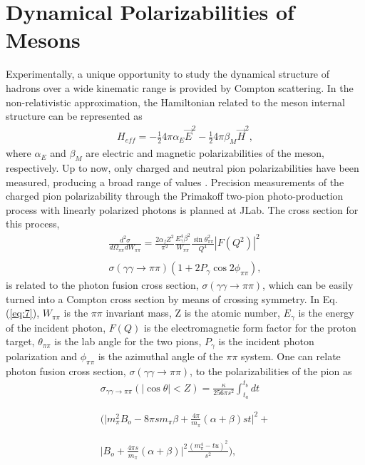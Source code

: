 \documentclass[3p,times,twocolumn]{revtex4}
\begin{document}
\section{Dynamical Polarizabilities of Mesons }

Experimentally, a unique opportunity to study the dynamical structure of hadrons over
a wide kinematic range is provided by Compton scattering. In the non-relativistic approximation, the Hamiltonian related to
the meson internal structure can be represented
as 
\begin{eqnarray}
H_{eff}=-\frac{1}{2}4\pi\alpha_{E}\vec{E}^{2}-\frac{1}{2}4\pi\beta_{M}\vec{H}^{2},\label{eq:6}
\end{eqnarray}
where $\alpha_{E}$ and $\beta_{M}$ are electric and magnetic
polarizabilities of the meson, respectively. Up to now,
only charged and neutral pion polarizabilities have been measured,
producing a broad range of values \cite{Ahrens,Antipov,Ba92}. Precision measurements of the charged pion polarizability through the
Primakoff two-pion photo-production process with linearly polarized
photons is planned at JLab. The cross section for this process,
\begin{eqnarray}
\frac{d^{2}\sigma}{d\Omega_{\pi\pi}dW_{\pi\pi}}=\frac{2\alpha_{f}Z^{2}}{\pi^{2}}\frac{E_{\gamma}^{4}\beta^{2}}{W_{\pi\pi}}\frac{\sin\theta_{\pi\pi}^{2}}{Q^{4}}|F(Q^{2})|^{2}
\nonumber \\ \nonumber \\
\sigma(\gamma\gamma\rightarrow\pi\pi)(1+2P_{\gamma}\cos2\phi_{\pi\pi}),\label{eq:7}
\end{eqnarray}
is related to the photon fusion cross section, $\sigma(\gamma\gamma\rightarrow\pi\pi)$,
which can be easily turned into a Compton cross section by means of crossing symmetry. In Eq.(\ref{eq:7}), $W_{\pi\pi}$ is the $\pi\pi$
invariant mass, Z is the atomic number, $E_{\gamma}$ is the energy
of the incident photon, $F(Q)$ is the electromagnetic form factor
for the proton target, $\theta_{\pi\pi}$ is the lab angle for the
two pions, $P_{\gamma}$ is the incident photon polarization and $\phi_{\pi\pi}$
is the azimuthal angle of the $\pi\pi$ system. One can
relate photon fusion cross section, $\sigma(\gamma\gamma\rightarrow\pi\pi)$,
to the polarizabilities of the pion \cite{Ba92,Do93} as
\begin{eqnarray}
\sigma_{\gamma\gamma\rightarrow\pi\pi}(|\cos\theta|<Z)=\frac{\kappa}{256\pi s^{2}}\int_{t_{a}}^{t_{b}}dt
\nonumber \\ \nonumber \\ \nonumber \\
\Bigg(\bigg|m_{\pi}^{2}B_{o}-8\pi sm_{\pi}\beta+\frac{4\pi}{m_{\pi}}(\alpha+\beta)st\bigg|^{2}+\label{eq:8} \nonumber \\
\nonumber \\ \nonumber \\
\bigg|B_{o}+\frac{4\pi s}{m_{\pi}}(\alpha+\beta)\bigg|^{2}\frac{(m_{\pi}^{4}-tu)^{2}}{s^{2}}\Bigg),
\end{eqnarray}
\end{document}
